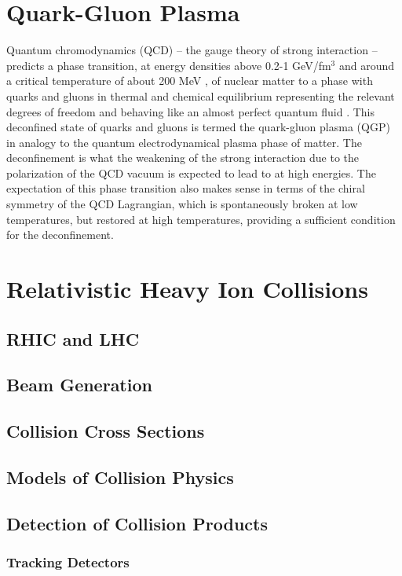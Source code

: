 \section{Quark-Gluon Plasma}
Quantum chromodynamics (QCD) -- the gauge theory of strong interaction \cite{KAPUSTA1979461, Shuryak1988} -- predicts a phase transition, at energy densities above 0.2-1 GeV/fm$^{3}$ \cite{Adam:2139456} and around a critical temperature of about 200 MeV \cite{2013arXiv1304.1452M}, of nuclear matter to a phase with quarks and gluons in thermal and chemical equilibrium representing the relevant degrees of freedom and behaving like an almost perfect quantum fluid \cite{PhysRevLett.109.152303}. This deconfined state of quarks and gluons is termed the quark-gluon plasma (QGP) in analogy to the quantum electrodynamical plasma phase of matter. The deconfinement is what the weakening of the strong interaction due to the polarization of the QCD vacuum is expected to lead to at high energies. The expectation of this phase transition also makes sense in terms of the chiral symmetry of the QCD Lagrangian, which is spontaneously broken at low temperatures, but restored at high temperatures, providing a sufficient condition for the deconfinement.

\section{Relativistic Heavy Ion Collisions}

\subsection{RHIC and LHC}
\subsection{Beam Generation}
\subsection{Collision Cross Sections}
\subsection{Models of Collision Physics}
\subsection{Detection of Collision Products}
\subsubsection{Tracking Detectors}
